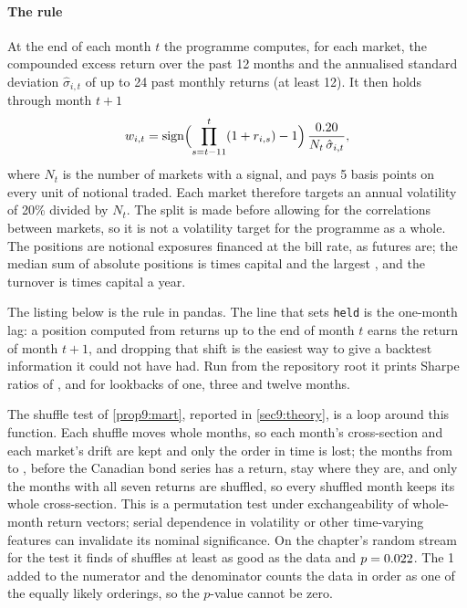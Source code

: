 \begin{chapterrefs}
\paragraph{The rule}
At the end of each month $t$ the programme computes, for each market, the compounded excess return over
the past 12 months and the annualised standard deviation $\hat\sigma_{i,t}$ of up to 24 past monthly
returns (at least 12). It then holds through month $t+1$
\begin{equation}\label{eq9:weights}
  w_{i,t} = \operatorname{sign}\Bigl(\prod_{s=t-11}^{t}(1+r_{i,s})-1\Bigr)\,\frac{0.20}{N_t\,\hat\sigma_{i,t}},
\end{equation}
where $N_t$ is the number of markets with a signal, and pays 5 basis points on every unit of notional
traded. Each market therefore targets an annual volatility of 20\% divided by $N_t$. The split is made
before allowing for the correlations between markets, so it is not a volatility target for the
programme as a whole. The positions are
notional exposures financed at the bill rate, as futures are; the median sum of absolute positions is
\tfLevMed{} times capital and the largest \tfLevMax, and the turnover is \tfTurn{} times capital a year.

The listing below is the rule in pandas. The line that sets \texttt{held} is the one-month lag: a
position computed from returns up to the end of month $t$ earns the return of month $t+1$, and
dropping that shift is the easiest way to give a backtest information it could not have had. Run from
the repository root it prints Sharpe ratios of \lbSROne, \lbSRThree{} and \lbSRTwelve{} for lookbacks
of one, three and twelve months.


The shuffle test of \cref{prop9:mart}, reported in \cref{sec9:theory}, is a loop around this
function. Each shuffle moves whole months, so each month's cross-section and each market's drift are
kept and only the order in time is lost; the \pmHeld{} months from \pmHeldFirst{} to \pmHeldLast, before the Canadian bond
series has a return, stay where they are, and only the \pmLive{} months with all seven returns are shuffled, so every shuffled
month keeps its whole cross-section. This is a permutation test under exchangeability of whole-month
return vectors; serial dependence in volatility or other time-varying features can invalidate its
nominal significance. On the chapter's random stream for the test it finds \pmCount{} of \pmN{} shuffles at least
as good as the data and $p=0.022$. The 1 added to the numerator and the denominator counts the data in order as one of the
equally likely orderings, so the $p$-value cannot be zero.



\end{chapterrefs}
